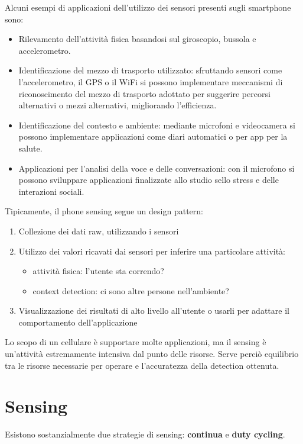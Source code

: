 Alcuni esempi di applicazioni dell'utilizzo dei sensori presenti sugli
smartphone sono:
\begin{itemize}
\item Rilevamento dell'attività fisica basandosi sul giroscopio, bussola e
accelerometro.
\item Identificazione del mezzo di trasporto utilizzato: sfruttando sensori come
l'accelerometro, il GPS o il WiFi si possono implementare meccanismi di
riconoscimento del mezzo di trasporto adottato per suggerire percorsi
alternativi o mezzi alternativi, migliorando l'efficienza.
\item Identificazione del contesto e ambiente: mediante microfoni e videocamera
si possono
implementare applicazioni come diari automatici o per app per la salute.
\item Applicazioni per l'analisi della voce e delle conversazioni: con il
microfono si possono sviluppare applicazioni finalizzate allo studio sello
stress
e delle interazioni sociali.
\end{itemize}

Tipicamente, il phone sensing segue un design pattern:
\begin{enumerate}
        \item Collezione dei dati raw, utilizzando i sensori
        \item Utilizzo dei valori ricavati dai sensori per inferire una
particolare attività:
        \begin{itemize}
                \item attività fisica: l'utente sta correndo?
                \item context detection: ci sono altre persone nell'ambiente?
        \end{itemize}
        \item Visualizzazione dei risultati di alto livello all'utente o usarli
per adattare il
comportamento dell'applicazione
\end{enumerate}

Lo scopo di un cellulare è supportare molte applicazioni, ma il sensing è
un'attività estremamente intensiva dal punto delle risorse. Serve perciò
equilibrio tra le risorse necessarie per operare e l'accuratezza della detection
ottenuta.

\section{Sensing}

Esistono sostanzialmente due strategie di sensing: \textbf{continua} e
\textbf{duty cycling}.

